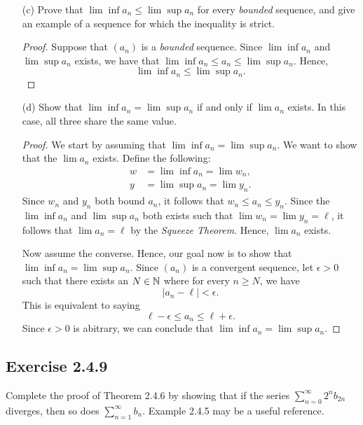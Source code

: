 \begin{enumerate}
\begin{proof}[Solution]
       \end{proof} 
    \item[(c)] Prove that \( \lim \inf a_n \leq \lim \sup a_n  \) for every \textit{bounded} sequence, and give an example of a sequence for which the inequality is strict.
        \begin{proof}
        Suppose that \( (a_n)\) is a \textit{bounded} sequence. Since \( \lim \inf a_n \) and \( \lim \sup a_n \) exists, we have that \( \lim \inf a_n \leq a_n \leq \lim \sup a_n  \). Hence, 
        \[ \lim \inf a_n \leq \lim \sup a_n.  \]
        \end{proof}
    \item[(d)] Show that \( \lim \inf a_n = \lim \sup a_n\) if and only if \( \lim a_n \) exists. In this case, all three share the same value.
        \begin{proof}
        We start by assuming that \( \lim \inf a_n = \lim \sup a_n \). We want to show that the \( \lim a_n  \) exists. Define the following:
        \begin{align*}
        w &= \lim \inf a_n = \lim w_n ,  \\ 
        y &= \lim \sup a_n = \lim y_n . 
        \end{align*} 
        Since \( w_n \) and \( y_n\) both bound \( a_n \), it follows that \( w_n \leq a_n \leq y_n\).
        Since the \( \lim \inf a_n \) and \( \lim \sup a_n \) both exists such that \( \lim  w_n = \lim y_n = \ell \), it follows that \( \lim a_n = \ell \) by the \textit{Squeeze Theorem}. Hence, \( \lim a_n \) exists.

        Now assume the converse. Hence, our goal now is to show that \( \lim \inf a_n = \lim \sup a_n\). Since \( (a_n)\) is a convergent sequence, let \( \epsilon > 0  \) such that there exists an \( N \in \mathbb{N}\) where for every \( n \geq N \), we have
        \[ |a_n - \ell| < \epsilon. \]  
        This is equivalent to saying 
        \[ \ell - \epsilon \leq a_n \leq \ell + \epsilon. \]
        Since \( \epsilon > 0  \) is abitrary, we can conclude that \( \lim \inf a_n = \lim \sup a_n  \).

        \end{proof}
        
\end{enumerate}


\subsection{Exercise 2.4.9} Complete the proof of Theorem 2.4.6 by showing that if the series \( \sum_{n=0}^{ \infty} 2^n b_{2n}  \) diverges, then so does \( \sum_{n=1}^{ \infty} b_n \). Example 2.4.5 may be a useful reference.

